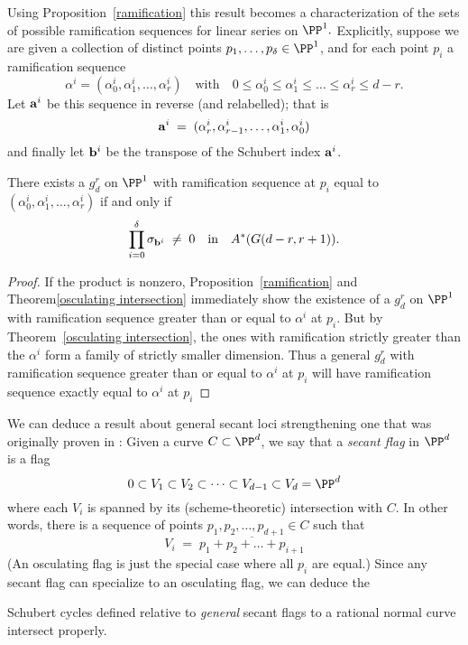 Using Proposition~\ref{ramification} this result becomes a characterization of the sets of possible ramification
sequences for linear series on $\PP^1.$
 Explicitly, suppose we are given a collection of distinct points $p_1,\dots,p_\delta \in \PP^1$, and for each point $p_i$ a ramification sequence
$$
\alpha^i = (\alpha^i_0, \alpha^i_1, \dots, \alpha^i_r) \quad \text{with} \quad 0 \leq \alpha^i_0 \leq \alpha^i_1 \leq \dots \leq \alpha^i_r \leq d-r.
$$
Let ${\bf a}^i$ be this sequence in reverse (and relabelled); that is
$$
{\bf a}^i \; = \; (\alpha^i_r, \alpha^i_{r-1}, \dots, \alpha^i_1, \alpha^i_0)
$$
and finally let ${\bf b}^i$ be the transpose of the Schubert index ${\bf a}^i$. 

\begin{corollary}
There exists a $g^r_d$ on $\PP^1$ with ramification sequence at $p_i$ equal to $(\alpha^i_0, \alpha^i_1, \dots, \alpha^i_r)$ if and only if 
$$
\prod_{i=0}^\delta  \sigma_{{\bf b}^i} \; \neq \; 0 \quad \text{in} \quad A^*(G(d-r, r+1)).
$$
\end{corollary}

\begin{proof}
If the product is nonzero, Proposition~\ref{ramification} and Theorem\ref{osculating intersection} immediately show the existence of a $g^r_d$ on $\PP^1$ with ramification sequence greater than or equal to $\alpha^i$ at $p_i$. But by Theorem~\ref{osculating intersection}, the ones with ramification strictly greater than the $\alpha^i$ form a family of strictly smaller dimension. Thus a general $g^r_d$ with ramification sequence greater than or equal to $\alpha^i$ at $p_i$ will have  ramification sequence exactly equal to $\alpha^i$ at $p_i$
\end{proof}

We can deduce a result about general secant loci strengthening one that was originally proven in \cite{Griffiths-Harris-BN}:
Given a curve $C \subset \PP^d$, we say that a \emph{secant flag} in $\PP^d$ is a flag
$$
0 \subset V_1 \subset V_2 \subset \dots \subset V_{d-1} \subset V_d = \PP^d
$$
where each $V_i$ is spanned by its (scheme-theoretic) intersection with $C$. In other words, there is a sequence of points $p_1, p_2, \dots, p_{d+1} \in C$ such that
$$
V_i \; = \; \overline{p_1+p_2+ \dots + p_{i+1}}
$$
(An osculating flag is just the special case where all $p_i$ are equal.) Since any secant flag can specialize to an osculating flag, we can deduce the

\begin{corollary}\label{secant schubert proper}
Schubert cycles defined relative to \emph{general} secant flags to a rational normal curve intersect properly.
\end{corollary} 

